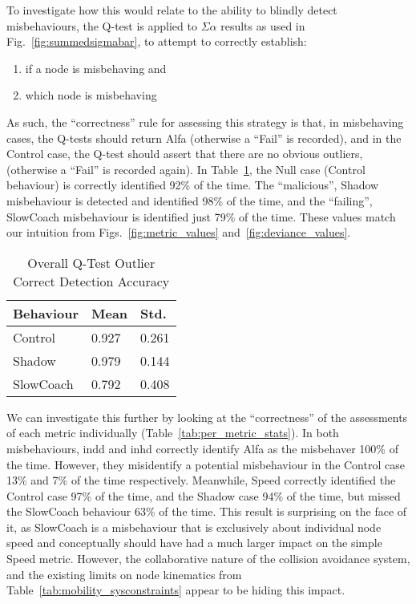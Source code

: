 To investigate how this would relate to the ability to blindly detect misbehaviours, the Q-test is applied to $\Sigma\alpha$ results as used in Fig.~\ref{fig:summedsigmabar}, to attempt to correctly establish:
\begin{enumerate}
  \item if a node is misbehaving and
  \item which node is misbehaving
\end{enumerate}

As such, the ``correctness'' rule for assessing this strategy is that, in misbehaving cases, the Q-tests should return Alfa (otherwise a ``Fail'' is recorded), and in the Control case, the Q-test should assert that there are no obvious outliers, (otherwise a ``Fail'' is recorded again).
In Table~\ref{tab:overall_stats}, the Null case (Control behaviour) is correctly identified 92\% of the time.
The ``malicious'', Shadow misbehaviour is detected and identified 98\% of the time, and the ``failing'', SlowCoach misbehaviour is identified just 79\% of the time. 
These values match our intuition from Figs.~\ref{fig:metric_values} and~\ref{fig:deviance_values}.

\begin{table}
  \caption{Overall Q-Test Outlier Correct Detection Accuracy}
  \centering
\begin{tabular}{lll}
\toprule
Behaviour &  Mean &   Std. \\
\midrule
Control   & 0.927 & 0.261 \\
Shadow    & 0.979 & 0.144 \\
SlowCoach & 0.792 & 0.408 \\
\bottomrule
\end{tabular}
  \label{tab:overall_stats}
\end{table}

We can investigate this further by looking at the ``correctness'' of the assessments of each metric individually (Table~\ref{tab:per_metric_stats}).
In both misbehaviours, \gls{indd} and \gls{inhd} correctly identify Alfa as the misbehaver 100\% of the time. 
However, they misidentify a potential misbehaviour in the Control case 13\% and 7\% of the time respectively.
Meanwhile, Speed correctly identified the Control case 97\% of the time, and the Shadow case 94\% of the time, but missed the SlowCoach behaviour 63\% of the time. 
This result is surprising on the face of it, as SlowCoach is a misbehaviour that is exclusively about individual node speed and conceptually should have had a much larger impact on the simple Speed metric.
However, the collaborative nature of the collision avoidance system, and the existing limits on node kinematics from Table~\ref{tab:mobility_sysconstraints} appear to be hiding this impact. 

